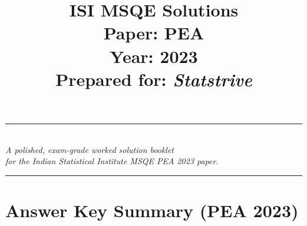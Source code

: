 \documentclass[11pt]{article}
\title{\textbf{ISI MSQE Solutions}\\[4pt]\large Paper: PEA \\ Year: 2023 \\[6pt] \normalsize Prepared for: \textit{Statstrive}}
\author{}
\date{}
\begin{document}
\maketitle
\thispagestyle{empty}

\begin{center}
\rule{0.8\textwidth}{0.6pt}\\[2pt]
\textit{A polished, exam-grade worked solution booklet \\ for the Indian Statistical Institute MSQE PEA 2023 paper.}\\[2pt]
\rule{0.8\textwidth}{0.6pt}
\end{center}

\vfill
\newpage

\section*{Answer Key Summary (PEA 2023)}
\end{document}
